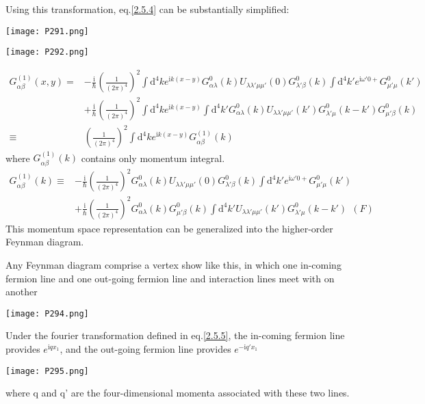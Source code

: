 Using this transformation, eq.\eqref{2.5.4} can be substantially simplified:
\begin{center}
\texttt{[image: P291.png]}
\end{center}\begin{center}
\texttt{[image: P292.png]}
\end{center}
\begin{align}
G_{\alpha\beta}^{(1)}(x,y)=&-\frac{\mathrm{i}}{\hbar}(\frac{1}{(2\pi)^4})^2\int \mathrm{d}^4ke^{\mathrm{i}k(x-y)}G_{\alpha\lambda}^0(k)U_{\lambda\lambda'\mu\mu'}(0)G_{\lambda'\beta}^0(k)\int \mathrm{d}^4k'e^{\mathrm{i}\omega'0+}G_{\mu'\mu}^0(k')\nonumber \\
&+\frac{\mathrm{i}}{\hbar}(\frac{1}{(2\pi)^4})^2\int \mathrm{d}^4ke^{\mathrm{i}k(x-y)}\int \mathrm{d}^4k'G_{\alpha\lambda}^0(k)U_{\lambda\lambda'\mu\mu'}(k')G_{\lambda'\mu}^0(k-k')G_{\mu'\beta}^0(k)\nonumber \\
\equiv & (\frac{1}{(2\pi)^4})^2\int \mathrm{d}^4ke^{\mathrm{i}k(x-y)}G_{\alpha\beta}^{(1)}(k) \nonumber
\end{align}
where $G_{\alpha\beta}^{(1)}(k)$ contains only momentum integral.
\begin{align}\label{2.5.8}
G_{\alpha\beta}^{(1)}(k)\equiv &-\frac{\mathrm{i}}{\hbar}(\frac{1}{(2\pi)^4})^2G_{\alpha\lambda}^0(k)U_{\lambda\lambda'\mu\mu'}(0)G_{\lambda'\beta}^0(k)\int \mathrm{d}^4k'e^{\mathrm{i}\omega'0+}G_{\mu'\mu}^0(k') \nonumber \\
&+\frac{\mathrm{i}}{\hbar}(\frac{1}{(2\pi)^4})^2G_{\alpha\lambda}^0(k)G_{\mu'\beta}^0(k)\int \mathrm{d}^4k'U_{\lambda\lambda'\mu\mu'}(k')G_{\lambda'\mu}^0(k-k')\ \ (F)
\end{align}
This momentum space representation can be generalized into the higher-order Feynman diagram.

Any Feynman diagram comprise a vertex show like this, in which one in-coming fermion line and one out-going fermion line and interaction lines meet with on another
\begin{center}
\texttt{[image: P294.png]}
\end{center}
Under the fourier transformation defined in eq.\eqref{2.5.5}, the in-coming fermion line provides $e^{\mathrm{i}qx_1}$, and the out-going fermion line provides $e^{-\mathrm{i}q'x_1}$
\begin{center}
\texttt{[image: P295.png]}
\end{center}

where q and q' are the four-dimensional momenta associated with these two lines.

